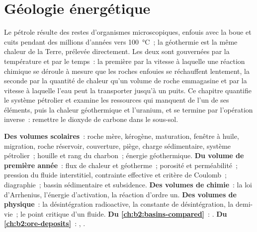 \chapter{Géologie énergétique}\label{ch:b2:energy-geology}

Le pétrole résulte des restes d'organismes microscopiques, enfouis avec la boue et cuits pendant des millions d'années
vers \qty{100}{\celsius}~; la géothermie est la même chaleur de la Terre, prélevée directement.
Les deux sont gouvernées par la température et par le temps~: la première par la vitesse à laquelle une réaction chimique se déroule
à mesure que les roches enfouies se réchauffent lentement, la seconde par la quantité de chaleur qu'un volume de roche emmagasine
et par la vitesse à laquelle l'eau peut la transporter jusqu'à un puits. Ce chapitre quantifie le système pétrolier et examine les ressources
qui manquent de l'un de ses éléments, puis la chaleur géothermique et l'uranium,
et se termine par l'opération inverse~: remettre le dioxyde de carbone dans le sous-sol.

\begin{recall}
\textbf{Des volumes scolaires}~: roche mère, kérogène, maturation, fenêtre à huile, migration, roche réservoir, couverture, piège,
charge sédimentaire, système pétrolier~; houille et rang du charbon~; énergie géothermique. \textbf{Du volume de première année}~: flux de chaleur
et géotherme~; porosité et perméabilité~; pression du fluide interstitiel, contrainte effective et critère de Coulomb~; diagraphie~;
bassin sédimentaire et subsidence. \textbf{Des volumes de chimie}~: la loi d'Arrhenius, l'énergie d'activation, la réaction d'ordre un.
\textbf{Des volumes de physique}~: la désintégration radioactive, la constante de désintégration, la demi-vie~;
le point critique d'un fluide.
\textbf{Du \cref{ch:b2:basins-compared}}~: .
\textbf{Du \cref{ch:b2:ore-deposits}}~: , .
\end{recall}

